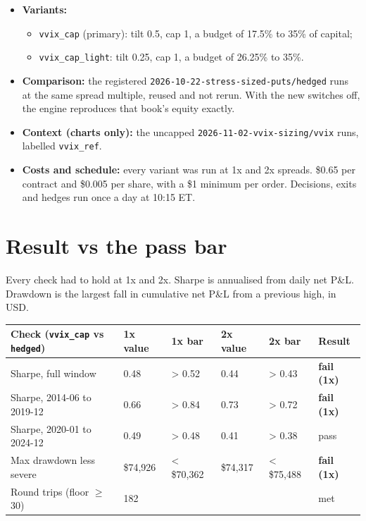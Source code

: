 \documentclass{article}
\begin{document}
\begin{itemize}
\item \textbf{Variants:}

\begin{itemize}

\item \texttt{vvix\_\allowbreak{}cap} (primary): tilt 0.5, cap 1, a budget of 17.5\% to 35\% of capital;

\item \texttt{vvix\_\allowbreak{}cap\_\allowbreak{}light}: tilt 0.25, cap 1, a budget of 26.25\% to 35\%.

\end{itemize}

\item \textbf{Comparison:} the registered \texttt{2026-\allowbreak{}10-\allowbreak{}22-\allowbreak{}stress-\allowbreak{}sized-\allowbreak{}puts/\allowbreak{}hedged} runs at the same spread multiple, reused and not rerun. With the new switches off, the engine reproduces that book's equity exactly.

\item \textbf{Context (charts only):} the uncapped \texttt{2026-\allowbreak{}11-\allowbreak{}02-\allowbreak{}vvix-\allowbreak{}sizing/\allowbreak{}vvix} runs, labelled \texttt{vvix\_\allowbreak{}ref}.

\item \textbf{Costs and schedule:} every variant was run at 1x and 2x spreads. \$0.65 per contract and \$0.005 per share, with a \$1 minimum per order. Decisions, exits and hedges run once a day at 10:15 ET.

\end{itemize}

\section{Result vs the pass bar}

Every check had to hold at 1x and 2x. Sharpe is annualised from daily net P\&L. Drawdown is the largest fall in cumulative net P\&L from a previous high, in USD.

\begin{center}\small
\begin{tabularx}{\linewidth}{>{\raggedright\arraybackslash}X l l l l >{\raggedright\arraybackslash}X}
\toprule
\textbf{Check (\texttt{vvix\_\allowbreak{}cap} vs \texttt{hedged})} & \textbf{1x value} & \textbf{1x bar} & \textbf{2x value} & \textbf{2x bar} & \textbf{Result} \\
\midrule
Sharpe, full window & 0.48 & > 0.52 & 0.44 & > 0.43 & \textbf{fail (1x)} \\
Sharpe, 2014-06 to 2019-12 & 0.66 & > 0.84 & 0.73 & > 0.72 & \textbf{fail (1x)} \\
Sharpe, 2020-01 to 2024-12 & 0.49 & > 0.48 & 0.41 & > 0.38 & pass \\
Max drawdown less severe & \$74,926 & < \$70,362 & \$74,317 & < \$75,488 & \textbf{fail (1x)} \\
Round trips (floor \ensuremath{\geq} 30) & 182 &  &  &  & met \\
\bottomrule
\end{tabularx}
\end{center}
\end{document}
